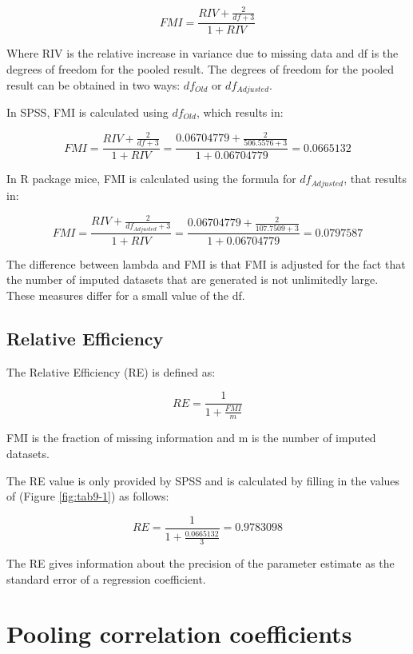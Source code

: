 \documentclass[
]{book}
\begin{document}
\begin{equation}
FMI = \frac{RIV + \frac{2}{df+3}}{1+RIV}
  \label{eq:fmi}
\end{equation}

Where RIV is the relative increase in variance due to missing data and df is the degrees of freedom for the pooled result. The degrees of freedom for the pooled result can be obtained in two ways: \({df_{Old}}\) or \({df_{Adjusted}}\).

In SPSS, FMI is calculated using \({df_{Old}}\), which results in:

\[FMI = \frac{RIV + \frac{2}{df+3}}{1+RIV}=\frac{0.06704779 + \frac{2}{506.5576+3}}{1+0.06704779}=0.0665132\]

In R package mice, FMI is calculated using the formula for \({df_{Adjusted}}\), that results in:

\[FMI = \frac{RIV + \frac{2}{df_{Adjusted}+3}}{1+RIV}=\frac{0.06704779 + \frac{2}{107.7509+3}}{1+0.06704779}=0.0797587\]

The difference between lambda and FMI is that FMI is adjusted for the fact that the number of imputed datasets that are generated is not unlimitedly large. These measures differ for a small value of the df.

\hypertarget{relative-efficiency}{%
\section{Relative Efficiency}\label{relative-efficiency}}

The Relative Efficiency (RE) is defined as:

\begin{equation}
RE = \frac{1}{1+\frac{FMI}{m}}
  \label{eq:re}
\end{equation}

FMI is the fraction of missing information and m is the number of imputed datasets.

The RE value is only provided by SPSS and is calculated by filling in the values of (Figure \ref{fig:tab9-1}) as follows:

\[RE = \frac{1}{1+\frac{0.0665132}{3}}=0.9783098\]

The RE gives information about the precision of the parameter estimate as the standard error of a regression coefficient.

\hypertarget{pooling-correlation-coefficients-1}{%
\chapter{Pooling correlation coefficients}\label{pooling-correlation-coefficients-1}}
\end{document}

